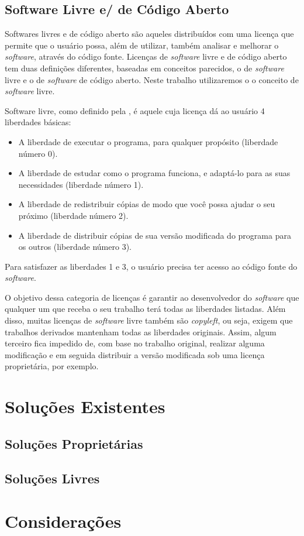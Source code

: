 \subsection{Software Livre e/ de Código Aberto}

Softwares livres e de código aberto são aqueles distribuídos com uma licença que permite que o usuário possa, além de utilizar, também analisar e melhorar o \emph{software}, através do código fonte. Licenças de \emph{software} livre e de código aberto tem duas definições diferentes, baseadas em conceitos parecidos, o de \emph{software} livre e o de \emph{software} de código aberto. Neste trabalho utilizaremos o o conceito de \emph{software} livre.

Software livre, como definido pela , é aquele cuja licença dá ao usuário 4 liberdades básicas\cite{GNUFreeSoftware}:

\begin{itemize}

\item A liberdade de executar o programa, para qualquer propósito (liberdade número 0).
\item A liberdade de estudar como o programa funciona, e adaptá-lo para as suas necessidades (liberdade número 1).
\item A liberdade de redistribuir cópias de modo que você possa ajudar o seu próximo (liberdade número 2).
\item A liberdade de distribuir cópias de sua versão modificada do programa para os outros (liberdade número 3).

\end{itemize}

Para satisfazer as liberdades 1 e 3, o usuário precisa ter acesso ao código fonte do \emph{software}.

O objetivo dessa categoria de licenças é garantir ao desenvolvedor do \emph{software} que qualquer um que receba o seu trabalho terá todas as liberdades listadas. Além disso, muitas licenças de \emph{software} livre também são \emph{copyleft}, ou seja, exigem que trabalhos derivados mantenham todas as liberdades originais. Assim, algum terceiro fica impedido de, com base no trabalho original, realizar alguma modificação e em seguida distribuir a versão modificada sob uma licença proprietária, por exemplo.


\section{Soluções Existentes}

\subsection{Soluções Proprietárias}

\subsection{Soluções Livres}

\section{Considerações}


